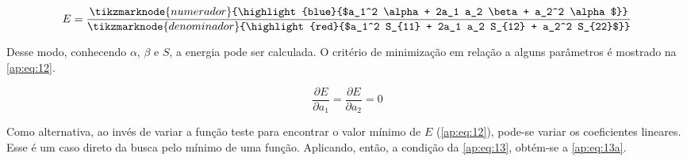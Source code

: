 \begin{figure}[htb]
    \vspace{2\baselineskip}
\begin{equation}
\label{ap:eq:12}
    E = \frac{\tikzmarknode{numerador}{\highlight{blue}{$a_1^2 \alpha + 2a_1 a_2 \beta + a_2^2 \alpha$}}}{\tikzmarknode{denominador}{\highlight{red}{$a_1^2 S_{11} + 2a_1 a_2 S_{12} + a_2^2 S_{22}$}}}
\end{equation}
\end{figure}

Desse modo, conhecendo $\alpha$, $\beta$ e $S$, a energia pode ser calculada. O critério de minimização em relação a alguns parâmetros é mostrado na \autoref{ap:eq:12}.

\begin{figure}[htb]
    \vspace{2\baselineskip}
\begin{equation}
\label{ap:eq:13}
    \frac{\partial E}{\partial a_1} = \frac{\partial E}{\partial a_2} = 0
\end{equation}
\end{figure}

Como alternativa, ao invés de variar a função teste para encontrar o valor mínimo de $E$ (\autoref{ap:eq:12}), pode-se variar os coeficientes lineares. Esse é um caso direto da busca pelo mínimo de uma função. Aplicando, então, a condição da \autoref{ap:eq:13}, obtém-se a \autoref{ap:eq:13a}.

